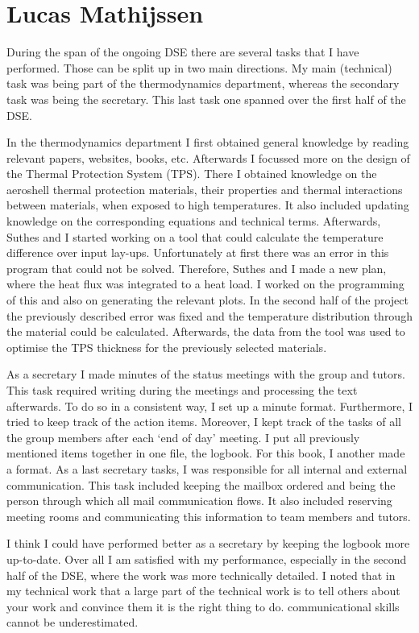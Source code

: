 \section{Lucas Mathijssen}
During the span of the ongoing DSE there are several tasks that I have performed. Those can be split up in two main directions. My main (technical) task was being part of the thermodynamics department, whereas the secondary task was being the secretary. This last task one spanned over the first half of the DSE.

In the thermodynamics department I first obtained general knowledge by reading relevant papers, websites, books, etc. Afterwards I focussed more on the design of the Thermal Protection System (TPS). There I obtained knowledge on the aeroshell thermal protection materials, their properties and thermal interactions between materials, when exposed to high temperatures. It also included updating knowledge on the corresponding equations and technical terms. Afterwards, Suthes and I started working on a tool that could calculate the temperature difference over input lay-ups. Unfortunately at first there was an error in this program that could not be solved. Therefore, Suthes and I made a new plan, where the heat flux was integrated to a heat load. I worked on the programming of this and also on generating the relevant plots. In the second half of the project the previously described error was fixed and the temperature distribution through the material could be calculated. Afterwards, the data from the tool was used to optimise the TPS thickness for the previously selected materials. 

As a secretary I made minutes of the status meetings with the group and tutors. This task required writing during the meetings and processing the text afterwards. To do so in a consistent way, I set up a minute format. Furthermore, I tried to keep track of the action items. Moreover, I kept track of the tasks of all the group members after each ‘end of day’ meeting. I put all previously mentioned items together in one file, the logbook. For this book, I another made a format. As a last secretary tasks, I was responsible for all internal and external communication. This task included keeping the mailbox ordered and being the person through which all mail communication flows. It also included reserving meeting rooms and communicating this information to team members and tutors.

I think I could have performed better as a secretary by keeping the logbook more up-to-date.  Over all I am satisfied with my performance, especially in the second half of the DSE, where the work was more technically detailed. I noted that in my technical work that a large part of the technical work is to tell others about your work and convince them it is the right thing to do. communicational skills cannot be underestimated.

